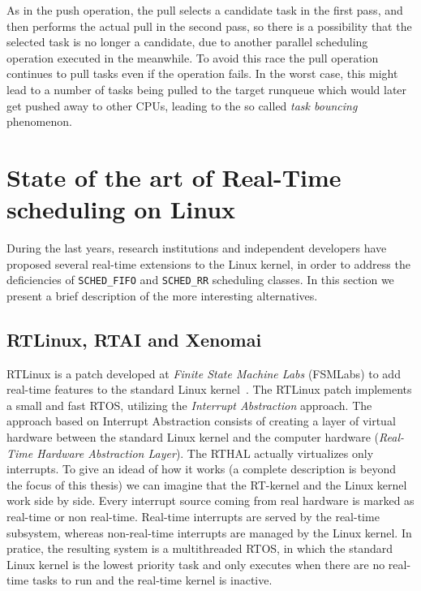 As in the push operation, the pull selects a candidate task in the
first pass, and then performs the actual pull in the second pass, so
there is a possibility that the selected task is no longer a
candidate, due to another parallel scheduling operation executed in
the meanwhile. To avoid this race the pull operation continues to pull
tasks even if the operation fails. In the worst case, this might lead
to a number of tasks being pulled to the target runqueue which would
later get pushed away to other CPUs, leading to the so called
\emph{task bouncing} phenomenon.

\section{State of the art of Real-Time scheduling on Linux\label{sec:StateArt}}

During the last years, research institutions and independent
developers have proposed several real-time extensions to the Linux
kernel, in order to address the deficiencies of \texttt{SCHED\_FIFO}
and \texttt{SCHED\_RR} scheduling classes. In this section we present
a brief description of the more interesting alternatives.

\subsection{RTLinux, RTAI and Xenomai\label{sec:StateArt_RTAI}}

RTLinux is a patch developed at \emph{Finite State Machine Labs}
(FSMLabs) to add real-time features to the standard Linux
kernel~\cite{yodaiken99}. The RTLinux patch implements a small and
fast RTOS, utilizing the \emph{Interrupt Abstraction} approach. The
approach based on Interrupt Abstraction consists of creating a layer
of virtual hardware between the standard Linux kernel and the computer
hardware (\emph{Real-Time Hardware Abstraction Layer}). The RTHAL
actually virtualizes only interrupts. To give an idead of how it works
(a complete description is beyond the focus of this thesis) we can
imagine that the RT-kernel and the Linux kernel work side by
side. Every interrupt source coming from real hardware is marked as
real-time or non real-time. Real-time interrupts are served by the
real-time subsystem, whereas non-real-time interrupts are managed by
the Linux kernel. In pratice, the resulting system is a multithreaded
RTOS, in which the standard Linux kernel is the lowest priority task
and only executes when there are no real-time tasks to run and the
real-time kernel is inactive.


